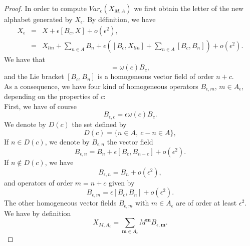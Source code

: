 \documentclass[english,11pt]{amsart}
\def\bm{\mathbf{m}}
\def\di{\displaystyle}
\begin{document}
\begin{proof}
In order to compute $Var_c (X_{M,A})$ we first obtain the letter of the new alphabet generated by $X_{\epsilon}$. By définition, we have
\begin{equation}
\left .
\begin{array}{lll}
    X_{\epsilon} & = & X +\epsilon [B_c ,X] +o(\epsilon^2 ) ,\\
     & = & X_{lin} +\di\sum_{n\in A} B_n + \epsilon \left ( [B_c ,X_{lin}] +
\di\sum_{n\in A} [B_c ,B_n ] \right ) +o(\epsilon^2 ) .
\end{array}
\right .
\end{equation}
We have that 
\begin{equation}
    [B_c ,X_{lin}]=\omega (c) B_c ,
\end{equation}
and the Lie bracket $[B_c ,B_n ]$ is a homogeneous vector field of order $n+c$. \\

As a consequence, we have four kind of homogeneous operators $B_{\epsilon ,m}$, $m\in A_{\epsilon}$, depending on the properties of $c$: \\

First, we have of course 
\begin{equation}
    B_{\epsilon ,c}=\epsilon \omega (c) B_c .
\end{equation}
We denote by $D(c)$ the set defined by
\begin{equation}
    D(c)=\{ n\in A, \ c-n \in A \} ,
\end{equation}
If $n\in D (c)$, we denote by $B_{\epsilon ,n}$ the vector field 
\begin{equation}
    B_{\epsilon , n} =B_n +\epsilon [B_c ,B_{n-c} ] +o(\epsilon^2 ) .
\end{equation}
If $n\not\in D(c)$, we have  
\begin{equation}
    B_{\epsilon , n} =B_n +o(\epsilon^2 ), 
\end{equation}
and operators of order $m=n+c$ given by 
\begin{equation}
    B_{\epsilon ,m} =\epsilon [B_c ,B_n ] +o(\epsilon^2 ) .
\end{equation}
The other homogeneous vector fields $B_{\epsilon ,m}$ with $m\in A_{\epsilon}$ are of order at least $\epsilon^2$. \\

We have by definition
\begin{equation}
    X_{M,A_{\epsilon}}=\di\sum_{\bm \in A_{\epsilon}} M^{\bm} B_{\epsilon ,\bm} .
\end{equation}


\end{proof}
\end{document}
